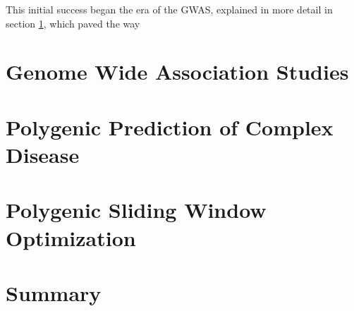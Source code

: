 This initial success began the era of the \ac{GWAS}, explained in more detail in section \ref{gwas}, which paved the way


\section{Genome Wide Association Studies} \label{gwas}
\section{Polygenic Prediction of Complex Disease}
\section{Polygenic Sliding Window Optimization}
\section{Summary}